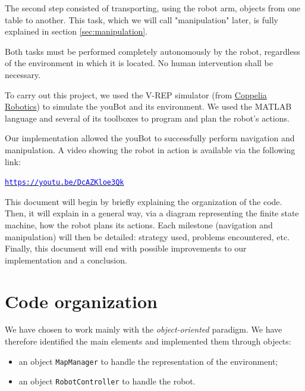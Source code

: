 \documentclass[a4paper, 10pt, conference]{ieeeconf}
\begin{document}
    The second step consisted of transporting, using the robot arm, objects from one table to another. This task, which we will call "manipulation" later, is fully explained in section \ref{sec:manipulation}.
    
    Both tasks must be performed completely autonomously by the robot, regardless of the environment in which it is located. No human intervention shall be necessary.
    
    To carry out this project, we used the V-REP simulator (from \href{https://www.coppeliarobotics.com}{Coppelia Robotics}) to simulate the youBot and its environment. We used the MATLAB language and several of its toolboxes to program and plan the robot's actions.
    
    Our implementation allowed the youBot to successfully perform navigation and manipulation. A video showing the robot in action is available via the following link:
    
    \begin{center}
        \href{https://youtu.be/DcAZKloe3Qk}{\texttt{\textcolor{blue}{https://youtu.be/DcAZKloe3Qk}}}
    \end{center}
    
    This document will begin by briefly explaining the organization of the code. Then, it will explain in a general way, via a diagram representing the finite state machine, how the robot plans its actions. Each milestone (navigation and manipulation) will then be detailed: strategy used, problems encountered, etc. Finally, this document will end with possible improvements to our implementation and a conclusion.
    
    
    \section{Code organization}
    
    We have chosen to work mainly with the \emph{object-oriented} paradigm. We have therefore identified the main elements and implemented them through objects:
    
    \begin{itemize}
        \item an object \texttt{MapManager} to handle the representation of the environment;
        \item an object \texttt{RobotController} to handle the robot.
    \end{itemize}
    
\end{document}
